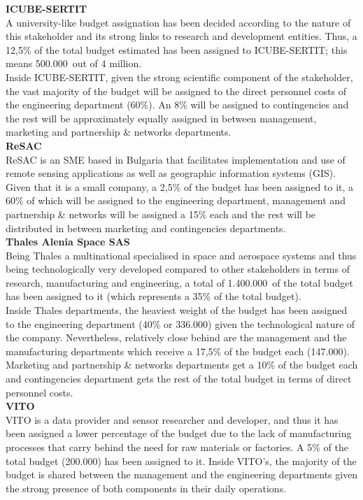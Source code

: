 \textbf{ICUBE-SERTIT}\\

A university-like budget assignation has been decided according to the nature of this stakeholder and its strong links to research and development entities. Thus, a 12,5\% of the total budget estimated has been assigned to ICUBE-SERTIT; this means 500.000\EUR \ out of 4 million.\\

Inside ICUBE-SERTIT, given the strong scientific component of the stakeholder, the vast majority of the budget will be assigned to the direct personnel costs of the engineering department (60\%). An 8\% will be assigned to contingencies and the rest will be approximately equally assigned in between management, marketing and partnership \& networks departments. \\

\textbf{ReSAC}\\

ReSAC is an SME based in Bulgaria that facilitates implementation and use of remote sensing applications as well as geographic information systems (GIS). Given that it is a small company, a 2,5\% of the budget has been assigned to it, a 60\% of which will be assigned to the engineering department, management and partnership \& networks will be assigned a 15\% each and the rest will be distributed in between marketing and contingencies departments. \\

\textbf{Thales Alenia Space SAS}\\

Being Thales a multinational specialised in space and aerospace systems and thus being technologically very developed compared to other stakeholders in terms of research, manufacturing and engineering, a total of 1.400.000\EUR \ of the total budget has been assigned to it (which represents a 35\% of the total budget). \\

Inside Thales departments, the heaviest weight of the budget has been assigned to the engineering department (40\% or 336.000\EUR) given the technological nature of the company. Nevertheless, relatively close behind are the management and the manufacturing departments which receive a 17,5\% of the budget each (147.000\EUR). Marketing and partnership \& networks departments get a 10\% of the budget each and contingencies department gets the rest of the total budget in terms of direct personnel costs.\\
 
\textbf{VITO}\\

VITO is a data provider and sensor researcher and developer, and thus it has been assigned a lower percentage of the budget due to the lack of manufacturing processes that carry behind the need for raw materials or factories. A 5\% of the total budget (200.000\EUR) has been assigned to it. Inside VITO’s, the majority of the budget is shared between the management and the engineering departments given the strong presence of both components in their daily operations.\\


